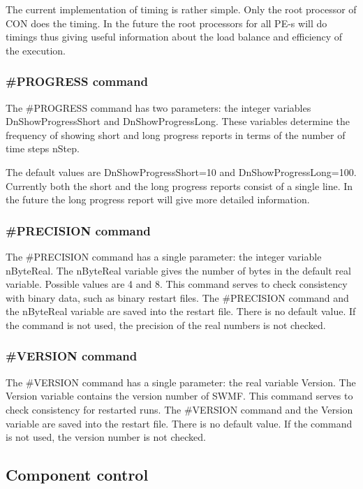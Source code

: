 The current implementation of timing is rather simple. Only the root
processor of CON does the timing. 
In the future the root processors for all PE-s will do timings 
thus giving useful information about the
load balance and efficiency of the execution.

\subsubsection{\#PROGRESS command}

The \#PROGRESS command has two parameters: the integer variables
DnShowProgressShort and DnShowProgressLong. These variables determine
the frequency of showing short and long progress reports in terms
of the number of time steps nStep. 

The default values are DnShowProgressShort=10 and DnShowProgressLong=100.
Currently both the short and the long progress reports consist
of a single line. In the future the long progress report will give
more detailed information.

\subsubsection{\#PRECISION command}

The \#PRECISION command has a single parameter: the integer variable
nByteReal. The nByteReal variable gives the number of bytes in the
default real variable. Possible values are 4 and 8. This command
serves to check consistency with binary data, such as binary
restart files. The \#PRECISION command and the nByteReal variable
are saved into the restart file. There is no default value.
If the command is not used, the precision of the real numbers is not 
checked.

\subsubsection{\#VERSION command}

The \#VERSION command has a single parameter: the real variable Version.
The Version variable contains the version number of SWMF. This command
serves to check consistency for restarted runs. The \#VERSION command
and the Version variable are saved into the restart file.
There is no default value.  If the command is not used, the version
number is not checked.

\subsection{Component control}

